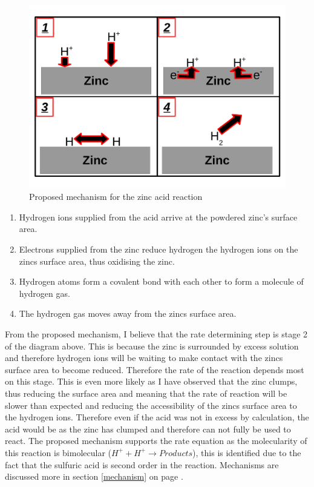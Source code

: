 \begin{figure}[H]
    \includegraphics[width=\textwidth]{./Analysis/Images/UncatalysedMechanism.pdf}
    \caption{Proposed mechanism for the zinc acid reaction} \label{fig:uncatalysedMechanism}
\end{figure}

\begin{enumerate}
\item Hydrogen ions supplied from the acid arrive at the powdered zinc's surface area.
\item Electrons supplied from the zinc reduce hydrogen the hydrogen ions on the zincs surface area, thus oxidising the zinc.
\item Hydrogen atoms form a covalent bond with each other to form a molecule of hydrogen gas.
\item The hydrogen gas moves away from the zincs surface area.
\end{enumerate}

From the proposed mechanism, I believe that the rate determining step is stage 2 of the diagram above. This is because the zinc is surrounded by excess solution and therefore hydrogen ions will be waiting to make contact with the zincs surface area to become reduced. Therefore the rate of the reaction depends most on this stage. This is even more likely as I have observed that the zinc clumps, thus reducing the surface area and meaning that the rate of reaction will be slower than expected and reducing the accessibility of the zincs surface area to the hydrogen ions. Therefore even if the acid was not in excess by calculation, the acid would be as the zinc has clumped and therefore can not fully be used to react. The proposed mechanism supports the rate equation as the molecularity of this reaction is bimolecular ($H^+ + H^+ \rightarrow Products$), this is identified due to the fact that the sulfuric acid is second order in the reaction. Mechanisms are discussed more in section \ref{mechanism} on page \pageref{mechanism}.




